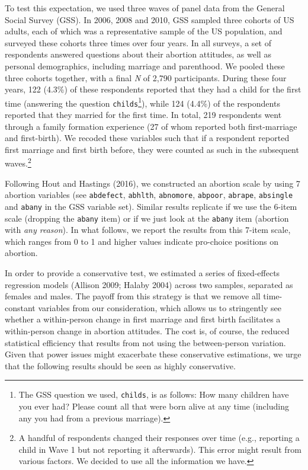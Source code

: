 \documentclass[
]{article}
\begin{document}
To test this expectation, we used three waves of panel data from the General Social Survey (GSS). In 2006, 2008 and 2010, GSS sampled three cohorts of US adults, each of which was a representative sample of the US population, and surveyed these cohorts three times over four years. In all surveys, a set of respondents answered questions about their abortion attitudes, as well as personal demographics, including marriage and parenthood. We pooled these three cohorts together, with a final \emph{N} of 2,790 participants. During these four years, 122 (4.3\%) of these respondents reported that they had a child for the first time (answering the question \texttt{childs}\footnote{The GSS question we used, \texttt{childs}, is as follows: How many children have you ever had? Please count all that were born alive at any time (including any you had from a previous marriage).}), while 124 (4.4\%) of the respondents reported that they married for the first time. In total, 219 respondents went through a family formation experience (27 of whom reported both first-marriage and first-birth). We recoded these variables such that if a respondent reported first marriage and first birth before, they were counted as such in the subsequent waves.\footnote{A handful of respondents changed their responses over time (e.g., reporting a child in Wave 1 but not reporting it afterwards). This error might result from various factors. We decided to use all the information we have.}

Following Hout and Hastings (2016), we constructed an abortion scale by using 7 abortion variables (see \texttt{abdefect}, \texttt{abhlth}, \texttt{abnomore}, \texttt{abpoor}, \texttt{abrape}, \texttt{absingle} and \texttt{abany} in the GSS variable set). Similar results replicate if we use the 6-item scale (dropping the \texttt{abany} item) or if we just look at the \texttt{abany} item (abortion with \emph{any reason}). In what follows, we report the results from this 7-item scale, which ranges from 0 to 1 and higher values indicate pro-choice positions on abortion.

In order to provide a conservative test, we estimated a series of fixed-effects regression models (Allison 2009; Halaby 2004) across two samples, separated as females and males. The payoff from this strategy is that we remove all time-constant variables from our consideration, which allows us to stringently see whether a within-person change in first marriage and first birth facilitates a within-person change in abortion attitudes. The cost is, of course, the reduced statistical efficiency that results from not using the between-person variation. Given that power issues might exacerbate these conservative estimations, we urge that the following results should be seen as highly conservative.
\end{document}
